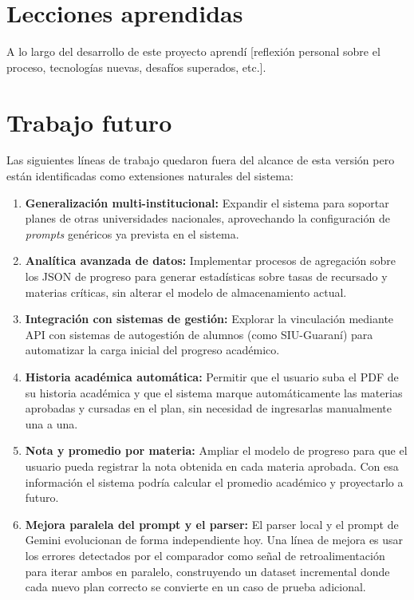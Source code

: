 \documentclass[12pt, a4paper]{report}
\begin{document}
\section{Lecciones aprendidas}

A lo largo del desarrollo de este proyecto aprendí [reflexión personal sobre el proceso,
tecnologías nuevas, desafíos superados, etc.].

\section{Trabajo futuro}

Las siguientes líneas de trabajo quedaron fuera del alcance de esta versión pero están
identificadas como extensiones naturales del sistema:

\begin{enumerate}
  \item \textbf{Generalización multi-institucional:} Expandir el sistema para soportar
        planes de otras universidades nacionales, aprovechando la configuración de
        \textit{prompts} genéricos ya prevista en el sistema.

  \item \textbf{Analítica avanzada de datos:} Implementar procesos de agregación sobre los
        JSON de progreso para generar estadísticas sobre tasas de recursado y materias
        críticas, sin alterar el modelo de almacenamiento actual.

  \item \textbf{Integración con sistemas de gestión:} Explorar la vinculación mediante API
        con sistemas de autogestión de alumnos (como SIU-Guaraní) para automatizar la
        carga inicial del progreso académico.

  \item \textbf{Historia académica automática:} Permitir que el usuario suba el PDF de su
        historia académica y que el sistema marque automáticamente las materias aprobadas y
        cursadas en el plan, sin necesidad de ingresarlas manualmente una a una.

  \item \textbf{Nota y promedio por materia:} Ampliar el modelo de progreso para que el
        usuario pueda registrar la nota obtenida en cada materia aprobada. Con esa
        información el sistema podría calcular el promedio académico y proyectarlo a futuro.

  \item \textbf{Mejora paralela del prompt y el parser:} El parser local y el prompt de
        Gemini evolucionan de forma independiente hoy. Una línea de mejora es usar los
        errores detectados por el comparador como señal de retroalimentación para iterar
        ambos en paralelo, construyendo un dataset incremental donde cada nuevo plan
        correcto se convierte en un caso de prueba adicional.


\end{enumerate}
\end{document}
